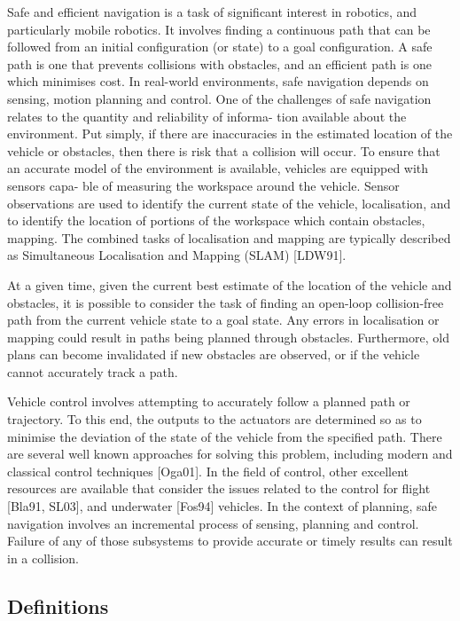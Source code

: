 Safe and efficient navigation is a task of significant interest in robotics, and particularly
mobile robotics. It involves finding a continuous path that can be followed from an initial
configuration (or state) to a goal configuration. A safe path is one that prevents collisions with
obstacles, and an efficient path is one which minimises cost. In real-world environments, safe
navigation depends on sensing, motion planning and control.
One of the challenges of safe navigation relates to the quantity and reliability of informa-
tion available about the environment. Put simply, if there are inaccuracies in the estimated
location of the vehicle or obstacles, then there is risk that a collision will occur. To ensure that
an accurate model of the environment is available, vehicles are equipped with sensors capa-
ble of measuring the workspace around the vehicle. Sensor observations are used to identify
the current state of the vehicle, localisation, and to identify the location of portions of the
workspace which contain obstacles, mapping. The combined tasks of localisation and mapping are typically described as Simultaneous Localisation and Mapping (SLAM) [LDW91].

At a given time, given the current best estimate of the location of the vehicle and obstacles,
it is possible to consider the task of finding an open-loop collision-free path from the current
vehicle state to a goal state. Any errors in localisation or mapping could result in paths being
planned through obstacles. Furthermore, old plans can become invalidated if new obstacles
are observed, or if the vehicle cannot accurately track a path.

Vehicle control involves attempting to accurately follow a planned path or trajectory. To
this end, the outputs to the actuators are determined so as to minimise the deviation of the
state of the vehicle from the specified path. There are several well known approaches for
solving this problem, including modern and classical control techniques [Oga01]. In the field
of control, other excellent resources are available that consider the issues related to the control
for flight [Bla91, SL03], and underwater [Fos94] vehicles.
In the context of planning, safe navigation involves an incremental process of sensing,
planning and control. Failure of any of those subsystems to provide accurate or timely results
can result in a collision.


\subsection{Definitions}
\label{definitions}

